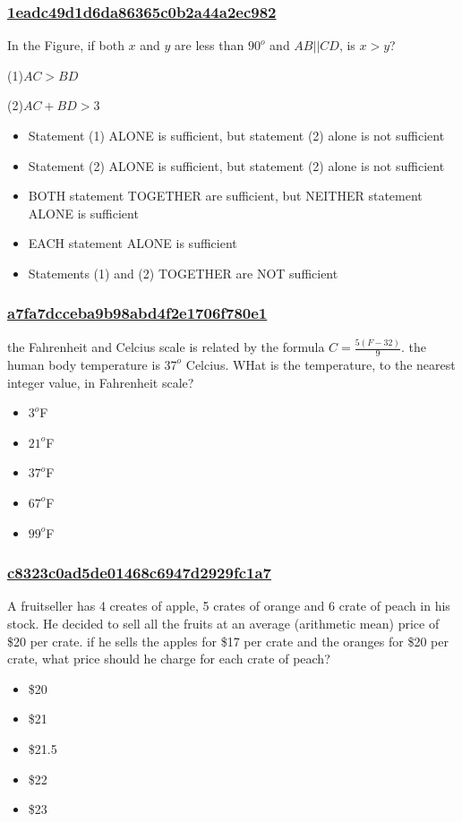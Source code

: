 \documentclass[]{beamer}
\begin{document}
\begin{frame}
    \frametitle{\underline{1eadc49d1d6da86365c0b2a44a2ec982}}
    In the Figure, if both $x$ and $y$ are less than $90^o$ and $AB||CD$, is $x>y$?\par
(1)$AC>BD$\par
(2)$AC+BD>3$
    \begin{itemize}
        \item
            Statement (1) ALONE is sufficient, but statement (2) alone is not sufficient
        \item
            Statement (2) ALONE is sufficient, but statement (2) alone is not sufficient
        \item
            BOTH statement TOGETHER are sufficient, but NEITHER statement ALONE is sufficient
        \item
            EACH statement ALONE is sufficient
        \item
            Statements (1) and (2) TOGETHER are NOT sufficient
    \end{itemize}
\end{frame}
\begin{frame}
    \frametitle{\underline{a7fa7dcceba9b98abd4f2e1706f780e1}}
    the Fahrenheit and Celcius scale is related by the formula $C=\frac{5(F-32)}{9}$. the human body temperature is $37^o$ Celcius. WHat is the temperature, to the nearest integer value, in Fahrenheit scale?
    \begin{itemize}
        \item
            $3^o$F
        \item
            $21^o$F
        \item
            $37^o$F
        \item
            $67^o$F
        \item
            $99^o$F
    \end{itemize}
\end{frame}
\begin{frame}
    \frametitle{\underline{c8323c0ad5de01468c6947d2929fc1a7}}
    A fruitseller has 4 creates of apple, 5 crates of orange and 6 crate of peach in his stock. He decided to sell all the fruits at an average (arithmetic mean) price of \$20 per crate. if he sells the apples for \$17 per crate and the oranges for \$20 per crate, what price should he charge for each crate of peach?
    \begin{itemize}
        \item
            \$20
        \item
            \$21
        \item
            \$21.5
        \item
            \$22
        \item
            \$23
    \end{itemize}
\end{frame}
\end{document}
